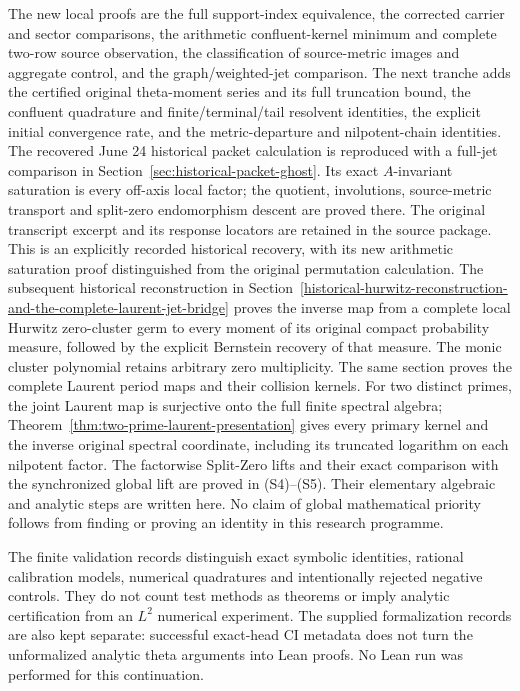 The new local proofs are the full support-index equivalence,
the corrected carrier and sector comparisons, the arithmetic
confluent-kernel minimum and complete two-row source observation,
the classification of source-metric images and aggregate control,
and the graph/weighted-jet comparison.
The next tranche adds the certified original theta-moment series
and its full truncation bound, the confluent quadrature and
finite/terminal/tail resolvent identities, the explicit initial
convergence rate, and the metric-departure and nilpotent-chain
identities. The recovered June 24 historical packet calculation
is reproduced with a full-jet comparison in
Section~\ref{sec:historical-packet-ghost}. Its exact
\(A\)-invariant saturation is every off-axis local factor;
the quotient, involutions, source-metric transport and split-zero
endomorphism descent are proved there. The original transcript
excerpt and its response locators are retained in the source
package. This is an explicitly recorded historical recovery,
with its new arithmetic saturation proof distinguished from
the original permutation calculation.
The subsequent historical reconstruction in
Section~\ref{historical-hurwitz-reconstruction-and-the-complete-laurent-jet-bridge}
proves the inverse map from a complete local Hurwitz zero-cluster
germ to every moment of its original compact probability measure,
followed by the explicit Bernstein recovery of that measure.
The monic cluster polynomial retains arbitrary zero multiplicity.
The same section proves the complete Laurent period maps and
their collision kernels.  For two distinct primes, the joint
Laurent map is surjective onto the full finite spectral algebra;
Theorem~\ref{thm:two-prime-laurent-presentation} gives every
primary kernel and the inverse original spectral coordinate,
including its truncated logarithm on each nilpotent factor.
The factorwise Split-Zero lifts and their exact comparison with
the synchronized global lift are proved in (S4)--(S5).
Their elementary algebraic and analytic steps are written here.
No claim of global mathematical priority follows from finding
or proving an identity in this research programme.

The finite validation records distinguish exact symbolic
identities, rational calibration models, numerical quadratures
and intentionally rejected negative controls. They do not count
test methods as theorems or imply analytic certification from
an \(L^2\) numerical experiment. The supplied formalization records
are also kept separate: successful exact-head CI metadata
does not turn the unformalized analytic theta arguments into
Lean proofs. No Lean run was performed for this continuation.

